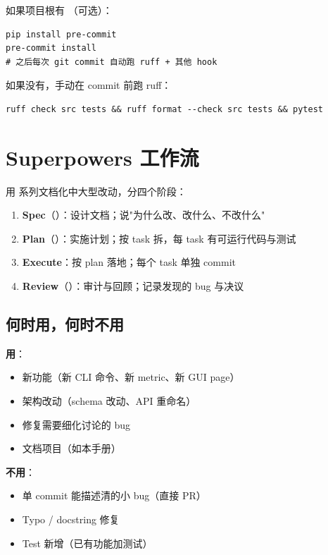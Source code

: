 如果项目根有 （可选）：

\begin{verbatim}
pip install pre-commit
pre-commit install
# 之后每次 git commit 自动跑 ruff + 其他 hook
\end{verbatim}

如果没有，手动在 commit 前跑 ruff：

\begin{verbatim}
ruff check src tests && ruff format --check src tests && pytest
\end{verbatim}

\section{Superpowers 工作流}

\openbench{} 用  系列文档化中大型改动，分四个阶段：

\begin{enumerate}
  \item \textbf{Spec}（）：设计文档；说"为什么改、改什么、不改什么"
  \item \textbf{Plan}（）：实施计划；按 task 拆，每 task 有可运行代码与测试
  \item \textbf{Execute}：按 plan 落地；每个 task 单独 commit
  \item \textbf{Review}（）：审计与回顾；记录发现的 bug 与决议
\end{enumerate}

\subsection{何时用，何时不用}

\textbf{用}：

\begin{itemize}
  \item 新功能（新 CLI 命令、新 metric、新 GUI page）
  \item 架构改动（schema 改动、API 重命名）
  \item 修复需要细化讨论的 bug
  \item 文档项目（如本手册）
\end{itemize}

\textbf{不用}：

\begin{itemize}
  \item 单 commit 能描述清的小 bug（直接 PR）
  \item Typo / docstring 修复
  \item Test 新增（已有功能加测试）
\end{itemize}

